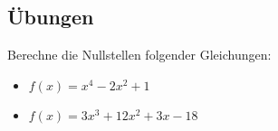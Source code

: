 \subsection{Übungen}
Berechne die Nullstellen folgender Gleichungen:
\begin{itemize}
\item $f(x) = x^4 - 2x^2 + 1$
\item $f(x) = 3x^3 + 12x^2 + 3x - 18$
\end{itemize}